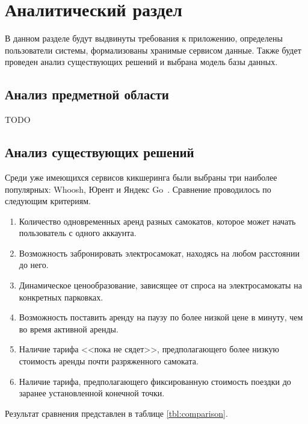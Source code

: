 \chapter{Аналитический раздел}

В данном разделе будут выдвинуты требования к приложению, определены пользователи системы, формализованы хранимые сервисом данные. Также будет проведен анализ существующих решений и выбрана модель базы данных.

\section{Анализ предметной области}

TODO

\section{Анализ существующих решений}

Среди уже имеющихся сервисов кикшеринга были выбраны три наиболее популярных: Whoosh, Юрент и Яндекс Go~\cite{hype}. Сравнение проводилось по следующим критериям.

\begin{enumerate}
    \item Количество одновременных аренд разных самокатов, которое может начать пользователь с одного аккаунта.
    \item Возможность забронировать электросамокат, находясь на любом расстоянии до него.
    \item Динамическое ценообразование, зависящее от спроса на электросамокаты на конкретных парковках.
    \item Возможность поставить аренду на паузу по более низкой цене в минуту, чем во время активной аренды.
    \item Наличие тарифа <<пока не сядет>>, предполагающего более низкую стоимость аренды почти разряженного самоката.
    \item Наличие тарифа, предполагающего фиксированную стоимость поездки до заранее установленной конечной точки.
\end{enumerate}

Результат сравнения представлен в таблице \ref{tbl:comparison}.

